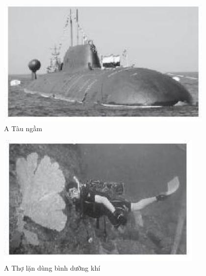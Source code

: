 \documentclass[10pt]{article}
\begin{document}
\begin{figure}[h]
\begin{center}
  \includegraphics[width=\textwidth]{2025_10_23_883c4b146e2332109fcdg-46(1)}
\captionsetup{labelformat=empty}
\caption{A Tàu ngầm}
\end{center}
\end{figure}

\begin{figure}[h]
\begin{center}
  \includegraphics[width=\textwidth]{2025_10_23_883c4b146e2332109fcdg-46}
\captionsetup{labelformat=empty}
\caption{A Thợ lặn dùng bình dưỡng khí}
\end{center}
\end{figure}
\end{document}

